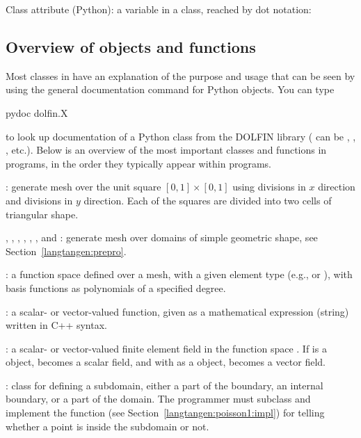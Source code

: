 Class attribute (Python): a variable in a class, reached by dot notation: \gln

\subsection{Overview of objects and functions}

Most classes in \fenics{} have an explanation of the purpose and usage
that can be seen by using the general documentation command
 for Python objects. You can type
\begin{progoutput}
pydoc dolfin.X
\end{progoutput}
\noindent
to look up documentation of a Python class  from the DOLFIN
library ( can be , ,
, etc.). Below is an overview of the most important classes
and functions
in \fenics{} programs, in the order they typically appear within programs.\gln

: generate mesh over the unit square
$[0,1]\times [0,1]$ using  divisions in $x$ direction and
 divisions in $y$ direction. Each of the  squares
are divided into two cells of triangular shape.\gln

, , , ,
, , and : generate mesh over
domains of simple geometric shape, see Section~\ref{langtangen:prepro}.\gln

:
a function space defined over a mesh, with a given element type
(e.g.,  or ), with basis functions as polynomials of
a specified degree.\gln

: a scalar- or vector-valued function, given as a
mathematical expression  (string) written in C++ syntax.
\gln

: a scalar- or vector-valued finite element field in
the function space . If  is a  object,
 becomes a scalar field, and with  as a
 object,  becomes a
vector field.\gln

: class for defining a subdomain, either a part of the
boundary, an internal boundary, or a part of the domain.
The programmer must subclass  and implement the
 function (see Section~\ref{langtangen:poisson1:impl}) for telling whether a point  is inside the subdomain or not.
\gln

